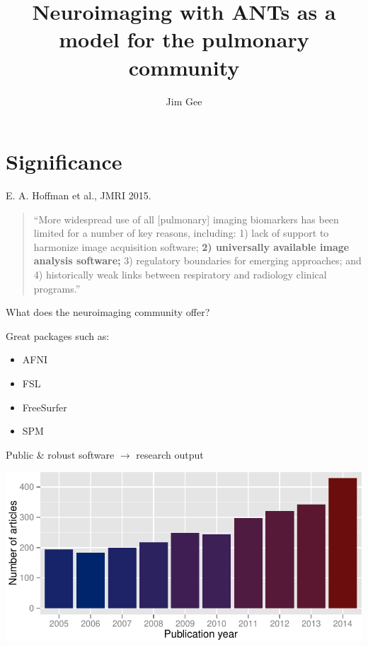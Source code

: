 \documentclass[ignorenonframetext,]{beamer}
\institute{}
\title[Lung imaging and ANTs]{Neuroimaging with ANTs as a model for the pulmonary community}
\author{Jim Gee}
\date{}
\begin{document}
\frame{\titlepage}

\begin{frame}
\tableofcontents[subsectionsonly]
\end{frame}

\section{Significance}\label{significance}

\begin{frame}{E. A. Hoffman et al., JMRI 2015.}

\begin{quote}
``More widespread use of all {[}pulmonary{]} imaging biomarkers has been
limited for a number of key reasons, including: 1) lack of support to
harmonize image acquisition software; \textbf{2) universally available
image analysis software;} 3) regulatory boundaries for emerging
approaches; and 4) historically weak links between respiratory and
radiology clinical programs.''
\end{quote}

\end{frame}

\begin{frame}{What does the neuroimaging community offer?}

Great packages such as:

\begin{itemize}
\itemsep1pt\parskip0pt
\item
  AFNI
\item
  FSL
\item
  FreeSurfer
\item
  SPM
\end{itemize}

\end{frame}

\begin{frame}{Public \& robust software $\longrightarrow$ research
output}

\includegraphics{stitchedSlides_files/figure-beamer/pubmedQuery-1.pdf}

\end{frame}
\end{document}
